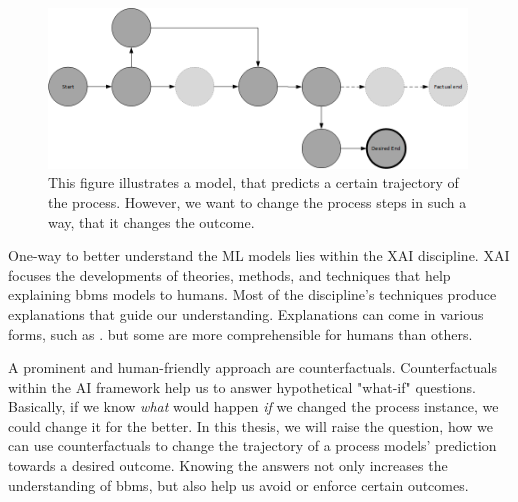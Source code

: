 \documentclass[./../../paper.tex]{subfiles}
\begin{document}
\begin{figure}[htb]
    \centering
    \includegraphics[width=0.99\textwidth]{figures/counterfactual_goal.png}
    \caption{This figure illustrates a model, that predicts a certain trajectory of the process. However, we want to change the process steps in such a way, that it changes the outcome.}
    \label{fig:desired_outcome}
\end{figure}

\noindent One-way to better understand the \gls{ML} models lies within the \gls{XAI} discipline. XAI focuses the developments of theories, methods, and techniques that help explaining \glspl{bbm} models to humans. Most of the discipline's techniques produce explanations that guide our understanding. Explanations can come in various forms, such as \needscite{}. but some are more comprehensible for humans than others. 

A prominent and human-friendly approach are counterfactuals\needscite{}. Counterfactuals within the AI framework help us to answer hypothetical "what-if" questions. Basically, if we know \emph{what} would happen \emph{if} we changed the process instance, we could change it for the better. In this thesis, we will raise the question, how we can use counterfactuals to change the trajectory of a process models' prediction towards a desired outcome. Knowing the answers not only increases the understanding of \glspl{bbm}, but also help us avoid or enforce certain outcomes. 
\end{document}
